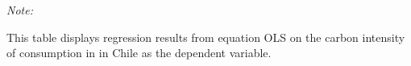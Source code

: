 \begin{table}[htbp!]
\begin{adjustbox}{width = 1\textwidth, max height = 0.95\textheight, center}
\begin{threeparttable}[b]
         \begin{tablenotes}\item \medskip \textit{Note:}
            \item This table displays regression results from equation OLS on the carbon intensity of consumption in  in Chile as the dependent variable. 
         \end{tablenotes}
      \end{threeparttable}
   \end{adjustbox}
\end{table}


